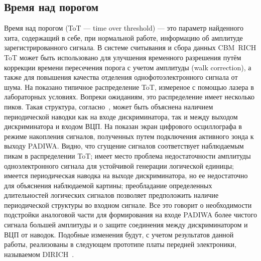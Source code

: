 \subsection{Время над порогом}\label{section:secToT}

Время над порогом (ToT --- time over threshold) --- это параметр найденного хита, содержащий в себе, при нормальной работе, информацию об амплитуде зарегистрированного сигнала. В системе считывания и сбора данных CBM~RICH ToT может быть использовано для улучшения временного разрешения путём коррекции времени пересечения порога с учетом амплитуды (walk correction), а также для повышения качества отделения однофотоэлектронного сигнала от шума. На  показано типичное распределение ToT, измереное с помощью лазера в лабораторных условиях. Вопреки ожиданиям, это распределение имеет несколько пиков. Такая структура, согласно~\cite{ToTinNoise}, может быть объяснена наличием периодической наводки как на входе дискриминатора, так и между выходом дискриминатора и входом ВЦП. На  показан экран цифрового осциллографа в режиме накопления сигналов, полученных путем подключения активного зонда к выходу PADIWA. Видно, что сгущение сигналов соответствует наблюдаемым пикам в распределении ToT; имеет место проблема недостаточности амплитуды одноэлектронного сигнала для устойчивой генерации логической единицы; имеется периодическая наводка на выходе дискриминатора, но ее недостаточно для объяснения наблюдаемой картины; преобладание определенных длительностей логических сигналов позволяет предположить наличие периодической структуры во входном сигнале. Все это говорит о необходимости подстройки аналоговой части для формирования на входе PADIWA более чистого сигнала большей амплитуды и о защите соединения между дискриминатором и ВЦП от наводок. Подобные изменения будут, с учетом результатов данной работы, реализованы в следующем прототипе платы передней электроники, называемом DIRICH~\cite{DIRICH}.


